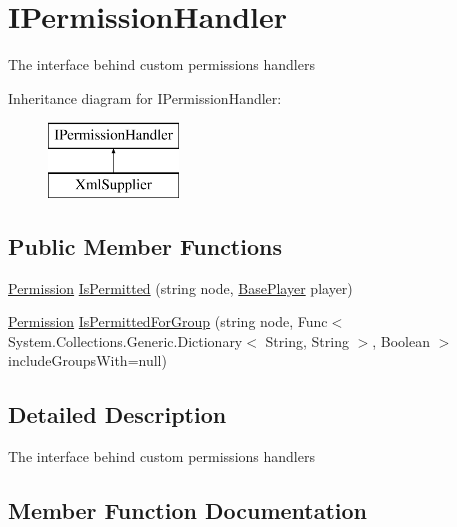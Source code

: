 \hypertarget{interfaceOTA_1_1Permissions_1_1IPermissionHandler}{}\section{I\+Permission\+Handler}
\label{interfaceOTA_1_1Permissions_1_1IPermissionHandler}


The interface behind custom permissions handlers  


Inheritance diagram for I\+Permission\+Handler\+:\begin{figure}[H]
\begin{center}
\leavevmode
\includegraphics[height=2.000000cm]{interfaceOTA_1_1Permissions_1_1IPermissionHandler}
\end{center}
\end{figure}
\subsection*{Public Member Functions}
\begin{DoxyCompactItemize}
\item 
\hyperlink{namespaceOTA_1_1Permissions_a5335d23d62bc219ccbf40b018c002e8d}{Permission} \hyperlink{interfaceOTA_1_1Permissions_1_1IPermissionHandler_a9f1eaccdce7bdd07256ea0cf8db1f545}{Is\+Permitted} (string node, \hyperlink{classOTA_1_1BasePlayer}{Base\+Player} player)
\item 
\hyperlink{namespaceOTA_1_1Permissions_a5335d23d62bc219ccbf40b018c002e8d}{Permission} \hyperlink{interfaceOTA_1_1Permissions_1_1IPermissionHandler_a740151c0fa816d964d42a40d4e0dc5dc}{Is\+Permitted\+For\+Group} (string node, Func$<$ System.\+Collections.\+Generic.\+Dictionary$<$ String, String $>$, Boolean $>$ include\+Groups\+With=null)
\end{DoxyCompactItemize}


\subsection{Detailed Description}
The interface behind custom permissions handlers 



\subsection{Member Function Documentation}
\hypertarget{interfaceOTA_1_1Permissions_1_1IPermissionHandler_a9f1eaccdce7bdd07256ea0cf8db1f545}{}
